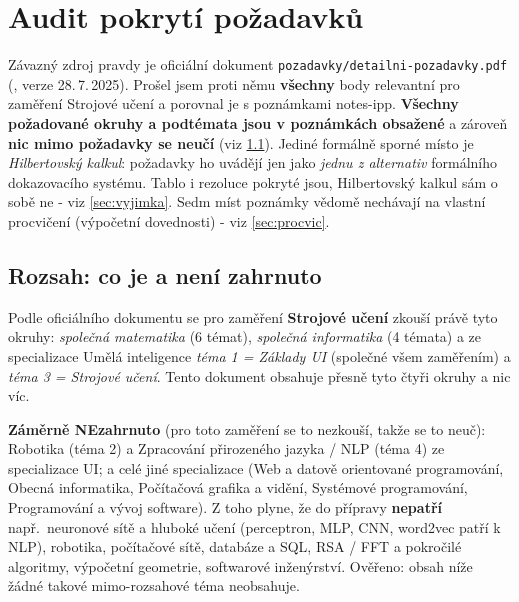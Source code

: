 \section{Audit pokrytí požadavků}
\label{sec:audit}

\begin{infobox}[title={Závěr auditu}]
Závazný zdroj pravdy je oficiální dokument \texttt{pozadavky/detailni-pozadavky.pdf} (, verze 28.\,7.\,2025). Prošel jsem proti němu \textbf{všechny} body relevantní pro zaměření Strojové učení a porovnal je s poznámkami notes-ipp. \textbf{Všechny požadované okruhy a podtémata jsou v poznámkách obsažené} a zároveň \textbf{nic mimo požadavky se neučí} (viz \ref{sec:rozsah}). Jediné formálně sporné místo je \emph{Hilbertovský kalkul}: požadavky ho uvádějí jen jako \emph{jednu z alternativ} formálního dokazovacího systému. Tablo i rezoluce pokryté jsou, Hilbertovský kalkul sám o sobě ne - viz \ref{sec:vyjimka}. Sedm míst poznámky vědomě nechávají na vlastní procvičení (výpočetní dovednosti) - viz \ref{sec:procvic}.
\end{infobox}

\subsection{Rozsah: co je a není zahrnuto}
\label{sec:rozsah}
Podle oficiálního dokumentu se pro zaměření \textbf{Strojové učení} zkouší právě tyto okruhy: \emph{společná matematika} (6 témat), \emph{společná informatika} (4 témata) a ze specializace Umělá inteligence \emph{téma 1 = Základy UI} (společné všem zaměřením) a \emph{téma 3 = Strojové učení}. Tento dokument obsahuje přesně tyto čtyři okruhy a nic víc.

\begin{gapbox}
\textbf{Záměrně NEzahrnuto} (pro toto zaměření se to nezkouší, takže se to neuč):
Robotika (téma 2) a Zpracování přirozeného jazyka / NLP (téma 4) ze specializace UI;
a celé jiné specializace (Web a datově orientované programování, Obecná informatika,
Počítačová grafika a vidění, Systémové programování, Programování a vývoj software).
Z toho plyne, že do přípravy \textbf{nepatří} např.\ neuronové sítě a hluboké učení
(perceptron, MLP, CNN, word2vec patří k NLP), robotika, počítačové sítě, databáze a SQL,
RSA / FFT a pokročilé algoritmy, výpočetní geometrie, softwarové inženýrství.
Ověřeno: obsah níže žádné takové mimo-rozsahové téma neobsahuje.
\end{gapbox}

